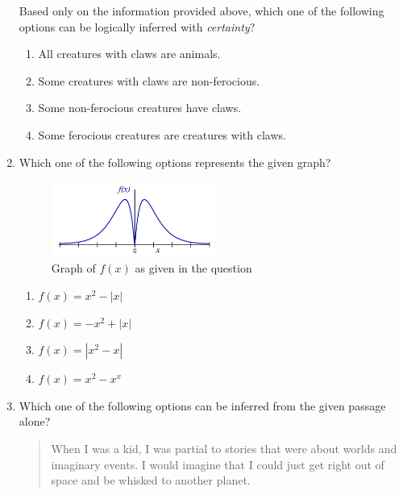 \documentclass[journal,12pt,onecolumn]{IEEEtran}
\theoremstyle{remark}
\begin{document}
\begin{enumerate}
Based only on the information provided above, which one of the following options can be logically inferred with \textit{certainty}? \hfill{}

\begin{multicols}{2}
\begin{enumerate}
\item All creatures with claws are animals.
\item Some creatures with claws are non-ferocious.
\item Some non-ferocious creatures have claws.
\item Some ferocious creatures are creatures with claws.
\end{enumerate}
\end{multicols}




\item Which one of the following options represents the given graph? \hfill{}

\begin{figure}[H]
\centering
\includegraphics[width=0.5\textwidth]{figs/image2.png} 
\caption{Graph of $f(x)$ as given in the question}
\label{fig:q7graph}
\end{figure}

\begin{multicols}{2}
\begin{enumerate}
\item $f(x) = x^2 - |x|$
\item $f(x) = -x^2 + |x|$
\item $f(x) = |x^2 - x|$
\item $f(x) = x^2 - x^x$
\end{enumerate}
\end{multicols}

\item Which one of the following options can be inferred from the given passage alone?

\begin{quote}
When I was a kid, I was partial to stories that were about worlds and imaginary events. I would imagine that I could just get right out of space and be whisked to another planet.


\end{quote}
\end{enumerate}
\end{document}
